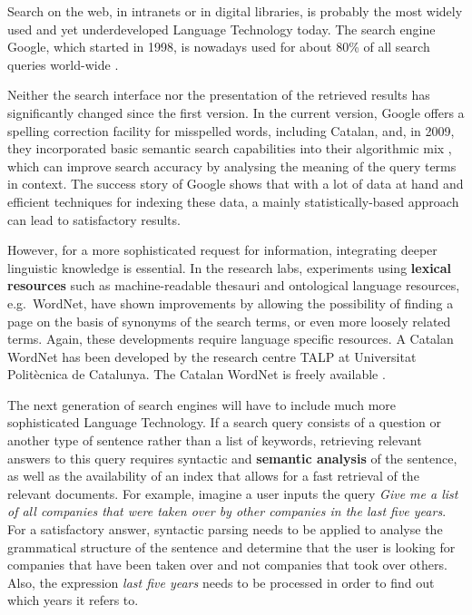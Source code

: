 \begin{multicols}{2}
Search on the web, in intranets or in digital libraries, is probably the most widely used and yet underdeveloped Language Technology today. The search engine Google, which started in 1998, is nowadays used for about 80\% of all search queries world-wide \cite{CAT-Nota22}. 

Neither the search interface nor the presentation of the retrieved results has significantly changed since the first version. In the current version, Google offers a spelling correction facility for misspelled words, including Catalan, and, in 2009, they incorporated basic semantic search capabilities into their algorithmic mix \cite{CAT-Nota23}, which can improve search accuracy by analysing the meaning of the query terms in context. The success story of Google shows that with a lot of data at hand and efficient techniques for indexing these data, a mainly statistically-based approach can lead to satisfactory results. 

However, for a more sophisticated request for information, integrating deeper linguistic knowledge is essential. In the research labs, experiments using \textbf{lexical resources} such as machine-readable thesauri and ontological language resources, e.g.~WordNet, have shown improvements by allowing the possibility of finding a page on the basis of synonyms of the search terms, or even more loosely related terms. Again, these developments require language specific resources. A Catalan WordNet has been developed by the research centre TALP at Universitat Politècnica de Catalunya. The Catalan WordNet is freely available \cite{CAT-Nota24}.


The next generation of search engines will have to include much more sophisticated Language Technology. If a search query consists of a question or another type of sentence rather than a list of keywords, retrieving relevant answers to this query requires syntactic and \textbf{semantic analysis} of the sentence, as well as the availability of an index that allows for a fast retrieval of the relevant documents. For example, imagine a user inputs the query \textit{Give me a list of all companies that were taken over by other companies in the last five years}. For a satisfactory answer, syntactic parsing needs to be applied to analyse the grammatical structure of the sentence and determine that the user is looking for companies that have been taken over and not companies that took over others. Also, the expression \textit{last five years} needs to be processed in order to find out which years it refers to. 



\end{multicols}
